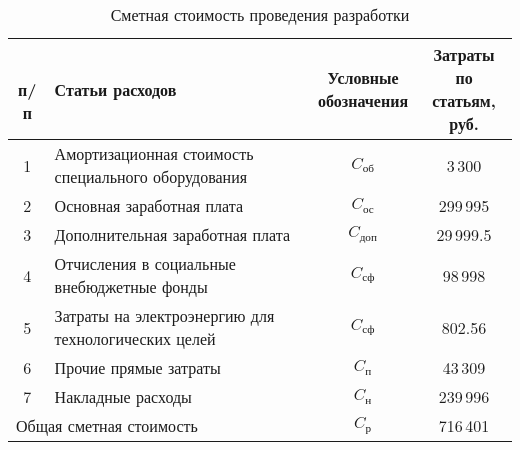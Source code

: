 \begin{table}[h!]
	\caption{Сметная стоимость проведения разработки}
	\begin{tabular}{|c|p{9cm}|c|c|}
		\hline
			\thead{\No \\ п/п} & Статьи расходов & \thead{Условные\\обозначения} & \thead{Затраты по\\ статьям, руб.}\\
		\hline
			1 & Амортизационная стоимость специального оборудования & $C_\textit{об}$ & 3\,300 \\
		\hline
			2 & Основная заработная плата & $C_\textit{ос}$ & 299\,995 \\
		\hline
			3 & Дополнительная заработная плата & $C_\textit{доп}$ & 29\,999.5 \\
		\hline
			4 & Отчисления в социальные внебюджетные фонды & $C_\textit{сф}$ & 98\,998 \\
		\hline
			5 & Затраты на электроэнергию для технологических целей  & $C_\textit{сф}$ & 802.56 \\
		\hline
			6 & Прочие прямые затраты & $C_\textit{п}$ & 43\,309 \\
		\hline		
			7 & Накладные расходы & $C_\textit{н}$ & 239\,996 \\
		\hline		
			\multicolumn{2}{|l|}{Общая сметная стоимость} & $C_\textit{р}$ & 716\,401 \\
		\hline
	\end{tabular}
\end{table}